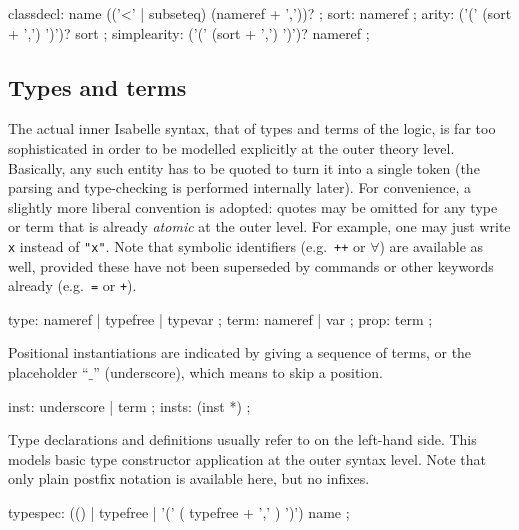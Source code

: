 \begin{rail}
  classdecl: name (('<' | subseteq) (nameref + ','))?
  ;
  sort: nameref
  ;
  arity: ('(' (sort + ',') ')')? sort
  ;
  simplearity: ('(' (sort + ',') ')')? nameref
  ;
\end{rail}


\subsection{Types and terms}\label{sec:types-terms}

The actual inner Isabelle syntax, that of types and terms of the logic, is far
too sophisticated in order to be modelled explicitly at the outer theory
level.  Basically, any such entity has to be quoted to turn it into a single
token (the parsing and type-checking is performed internally later).  For
convenience, a slightly more liberal convention is adopted: quotes may be
omitted for any type or term that is already \emph{atomic} at the outer level.
For example, one may just write \texttt{x} instead of \texttt{"x"}.  Note that
symbolic identifiers (e.g.\ \texttt{++} or $\forall$) are available as well,
provided these have not been superseded by commands or other keywords already
(e.g.\ \texttt{=} or \texttt{+}).

\begin{rail}
  type: nameref | typefree | typevar
  ;
  term: nameref | var
  ;
  prop: term
  ;
\end{rail}

Positional instantiations are indicated by giving a sequence of terms, or the
placeholder ``$\_$'' (underscore), which means to skip a position.

\begin{rail}
  inst: underscore | term
  ;
  insts: (inst *)
  ;
\end{rail}

Type declarations and definitions usually refer to  on
the left-hand side.  This models basic type constructor application at the
outer syntax level.  Note that only plain postfix notation is available here,
but no infixes.

\begin{rail}
  typespec: (() | typefree | '(' ( typefree + ',' ) ')') name
  ;
\end{rail}


